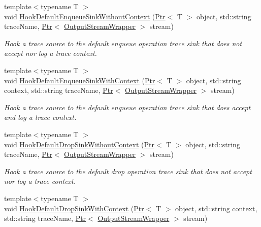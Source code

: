 \begin{DoxyCompactItemize}
{\footnotesize template$<$typename T $>$ }\\void \hyperlink{classns3_1_1AsciiTraceHelper_a5e097b4f87595c7578f050ecf0f126ec}{Hook\+Default\+Enqueue\+Sink\+Without\+Context} (\hyperlink{classns3_1_1Ptr}{Ptr}$<$ T $>$ object, std\+::string trace\+Name, \hyperlink{classns3_1_1Ptr}{Ptr}$<$ \hyperlink{classns3_1_1OutputStreamWrapper}{Output\+Stream\+Wrapper} $>$ stream)
\begin{DoxyCompactList}\small\item\em Hook a trace source to the default enqueue operation trace sink that does not accept nor log a trace context. \end{DoxyCompactList}\item 
{\footnotesize template$<$typename T $>$ }\\void \hyperlink{classns3_1_1AsciiTraceHelper_a5e4d1e6ccbcd1b451082ca16e54381c6}{Hook\+Default\+Enqueue\+Sink\+With\+Context} (\hyperlink{classns3_1_1Ptr}{Ptr}$<$ T $>$ object, std\+::string context, std\+::string trace\+Name, \hyperlink{classns3_1_1Ptr}{Ptr}$<$ \hyperlink{classns3_1_1OutputStreamWrapper}{Output\+Stream\+Wrapper} $>$ stream)
\begin{DoxyCompactList}\small\item\em Hook a trace source to the default enqueue operation trace sink that does accept and log a trace context. \end{DoxyCompactList}\item 
{\footnotesize template$<$typename T $>$ }\\void \hyperlink{classns3_1_1AsciiTraceHelper_a09c35d037a79878dfe7bbaee711196e2}{Hook\+Default\+Drop\+Sink\+Without\+Context} (\hyperlink{classns3_1_1Ptr}{Ptr}$<$ T $>$ object, std\+::string trace\+Name, \hyperlink{classns3_1_1Ptr}{Ptr}$<$ \hyperlink{classns3_1_1OutputStreamWrapper}{Output\+Stream\+Wrapper} $>$ stream)
\begin{DoxyCompactList}\small\item\em Hook a trace source to the default drop operation trace sink that does not accept nor log a trace context. \end{DoxyCompactList}\item 
{\footnotesize template$<$typename T $>$ }\\void \hyperlink{classns3_1_1AsciiTraceHelper_ab2240f7d973973bade779ec55cef449a}{Hook\+Default\+Drop\+Sink\+With\+Context} (\hyperlink{classns3_1_1Ptr}{Ptr}$<$ T $>$ object, std\+::string context, std\+::string trace\+Name, \hyperlink{classns3_1_1Ptr}{Ptr}$<$ \hyperlink{classns3_1_1OutputStreamWrapper}{Output\+Stream\+Wrapper} $>$ stream)

\end{DoxyCompactItemize}
